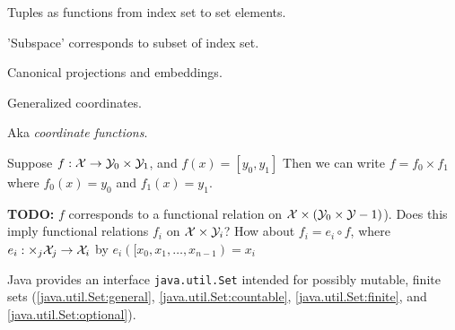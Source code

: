 Tuples as functions from index set to set elements.

'Subspace' corresponds to subset of index set.

Canonical projections and embeddings.

Generalized coordinates.

\label{sec:Cartesion-product-functions}

Aka \textit{coordinate functions}.

Suppose $f : \mathcal{X} \rightarrow \mathcal{Y}_0 \times \mathcal{Y}_1$,
and $f \left( x \right) = \left[ y_0 ,y_1 \right]$
Then we can write $f = f_0 \times f_1$ where
$f_0 \left( x \right) = y_0 $
and
$f_1 \left( x \right) = y_1 $.

\textbf{TODO:} $f$ corresponds to a functional relation on 
$\mathcal{X} \times \left( \mathcal{Y}_0 \times \mathcal{Y}-1 \right)$).
Does this imply functional relations $f_i$ on
$\mathcal{X} \times \mathcal{Y}_i$?
How about $f_i = e_i \circ f$,
where $e_i : \times_j \mathcal{X}_j  \rightarrow \mathcal{X}_i$ by
$e_i \left( [x_0, x_1, \ldots , x_{n-1} \right) = x_i$ 


\lstset{language=Java}

Java provides an interface \lstinline|java.util.Set| intended for
possibly mutable, finite sets (\autoref{java.util.Set:general},
 \autoref{java.util.Set:countable}, 
 \autoref{java.util.Set:finite}, 
 and
\autoref{java.util.Set:optional}).

